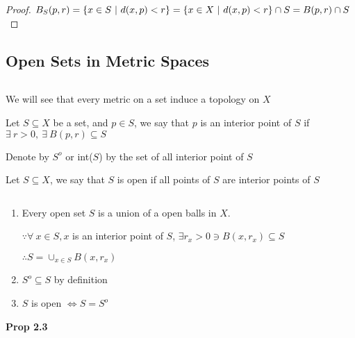 \begin{proof}
	$B_S(p,r) = \{x \in S ~|~ d(x,p) < r\} = \{x \in X ~|~ d(x,p) < r\} \cap S\\=B(p,r) \cap S$
\end{proof}

\subsection{Open Sets in Metric Spaces} $ $

We will see that every metric on a set induce a topology on $X$

\begin{defn}
	Let $S \subseteq X$ be a set, and $p \in S$, we say that $p$ is an interior point of $S$ if $\exists~ r > 0,~\exists~B(p,r) \subseteq S$
	
	Denote by $S^o$ or int($S$) by the set of all interior point of $S$
\end{defn}

\begin{defn}[open]
	Let $S \subseteq X$, we say that $S$ is open if all points of $S$ are interior points of $S$
\end{defn}

\newpage

\begin{rmk*}$ $
	\begin{enumerate}[wide]
		\item Every open set $S$ is a union of a open balls in $X$.
		
		$\because \forall~x \in S,x$ is an interior point of $S$, $\exists r_x > 0 \ni B(x,r_x) \subseteq S$
		
		$\therefore S = \cup_{x \in S}B(x,r_x)$
		
		\item $S^o \subseteq S$ by definition
		\item $S$ is open $\Leftrightarrow S = S^o$
	\end{enumerate}
\end{rmk*}

\textbf{Prop 2.3}

